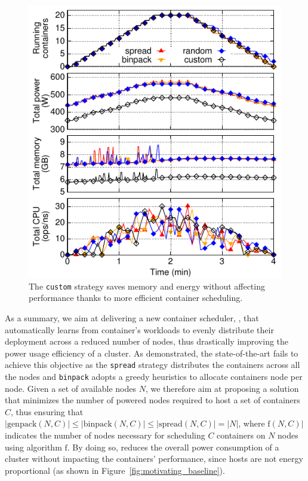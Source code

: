 \begin{figure}[t]
  \centering
  \includegraphics[width=.7\linewidth]{Figures/plots/motivating/spread-binpack-random-custom}
  \caption{The \texttt{custom} strategy saves memory and energy without affecting performance thanks to more efficient container scheduling.}
  \label{fig:motivating}
\end{figure}

\newpage

As a summary, we aim at delivering a new container scheduler, \GP{}, that automatically learns from container's workloads to evenly distribute their deployment across a reduced number of nodes, thus drastically improving the power usage efficiency of a cluster.
As demonstrated, the state-of-the-art fails to achieve this objective as the \texttt{spread} strategy distributes the containers across all the nodes and \texttt{binpack} adopts a greedy heuristics to allocate containers node per node.
Given a set of available nodes $N$, we therefore aim at proposing a solution that minimizes the number of powered nodes required to host a set of containers $C$, thus ensuring that $|\text{genpack}(N,C)| \le |\text{binpack}(N,C)| \le |\text{spread}(N,C)| = |N|$, where $\text{f}(N,C)|$ indicates the number of nodes necessary for scheduling $C$ containers on $N$ nodes using algorithm $\text{f}$.
By doing so, \GP{} reduces the overall power consumption of a cluster without impacting the containers' performance, since hosts are not energy proportional (as shown in Figure~\ref{fig:motivating_baseline}).

